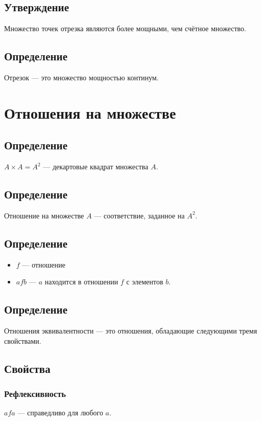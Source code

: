 \documentclass{article}
\begin{document}
\subsection{Утверждение}
Множество точек отрезка являются более мощными, чем счётное множество.


\subsection{Определение}
Отрезок --- это множество мощностью континум.



\section{Отношения на множестве}

\subsection{Определение}
$A \times A = A^2$ --- декартовые квадрат множества $A$.


\subsection{Определение}
Отношение на множестве $A$ --- соответствие, заданное на $A^2$.

\subsection{Определение}
\begin{itemize}
    \item $f$ --- отношение \\
    \item $a f b$ --- $a$ находится в отношении $f$ с элементов $b$.
\end{itemize}


\subsection{Определение}
Отношения эквивалентности --- это отношения, обладающие следующими тремя свойствами.


\subsection{Свойства}

\subsubsection{Рефлексивность}
$a f a$ --- справедливо для любого $a$.
\end{document}

